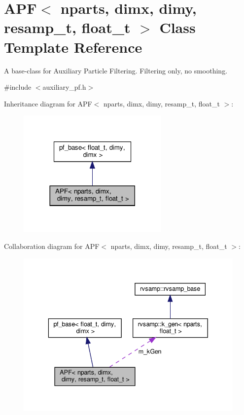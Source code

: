 \hypertarget{classAPF}{}\section{A\+PF$<$ nparts, dimx, dimy, resamp\+\_\+t, float\+\_\+t $>$ Class Template Reference}
\label{classAPF}


A base-\/class for Auxiliary Particle Filtering. Filtering only, no smoothing.  




{\ttfamily \#include $<$auxiliary\+\_\+pf.\+h$>$}



Inheritance diagram for A\+PF$<$ nparts, dimx, dimy, resamp\+\_\+t, float\+\_\+t $>$\+:\nopagebreak
\begin{figure}[H]
\begin{center}
\leavevmode
\includegraphics[width=209pt]{classAPF__inherit__graph}
\end{center}
\end{figure}


Collaboration diagram for A\+PF$<$ nparts, dimx, dimy, resamp\+\_\+t, float\+\_\+t $>$\+:\nopagebreak
\begin{figure}[H]
\begin{center}
\leavevmode
\includegraphics[width=336pt]{classAPF__coll__graph}
\end{center}
\end{figure}
